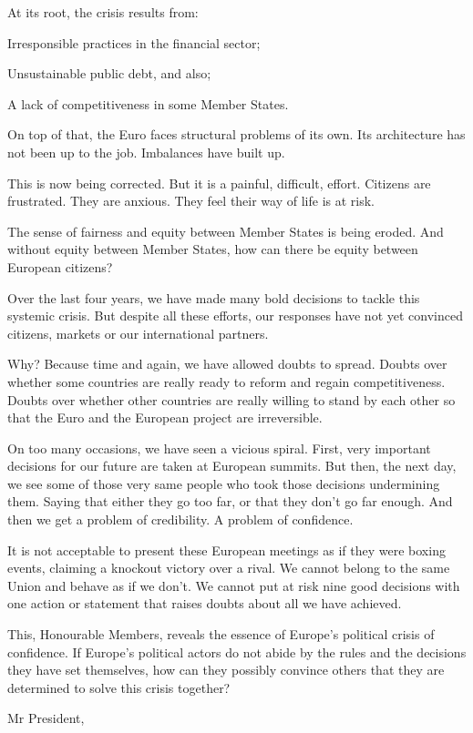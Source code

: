 \documentclass[a4paper,11pt]{article}
\begin{document}
At its root, the crisis results from:

    Irresponsible practices in the financial sector;

    Unsustainable public debt, and also;

    A lack of competitiveness in some Member States.

On top of that, the Euro faces structural problems of its own. Its architecture has not been up to the job. Imbalances have built up.

This is now being corrected. But it is a painful, difficult, effort. Citizens are frustrated. They are anxious. They feel their way of life is at risk.

The sense of fairness and equity between Member States is being eroded. And without equity between Member States, how can there be equity between European citizens?

Over the last four years, we have made many bold decisions to tackle this systemic crisis. But despite all these efforts, our responses have not yet convinced citizens, markets or our international partners.

Why? Because time and again, we have allowed doubts to spread. Doubts over whether some countries are really ready to reform and regain competitiveness. Doubts over whether other countries are really willing to stand by each other so that the Euro and the European project are irreversible.

On too many occasions, we have seen a vicious spiral. First, very important decisions for our future are taken at European summits. But then, the next day, we see some of those very same people who took those decisions undermining them. Saying that either they go too far, or that they don't go far enough. And then we get a problem of credibility. A problem of confidence.

It is not acceptable to present these European meetings as if they were boxing events, claiming a knockout victory over a rival. We cannot belong to the same Union and behave as if we don't. We cannot put at risk nine good decisions with one action or statement that raises doubts about all we have achieved.

This, Honourable Members, reveals the essence of Europe's political crisis of confidence. If Europe's political actors do not abide by the rules and the decisions they have set themselves, how can they possibly convince others that they are determined to solve this crisis together?

Mr President,
\end{document}
